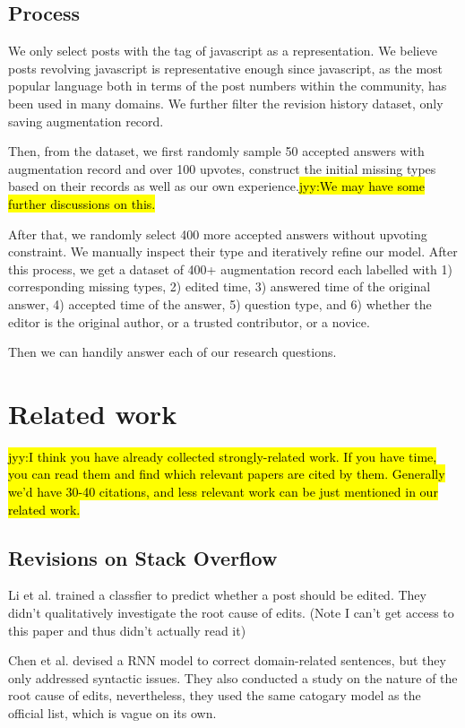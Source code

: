\documentclass[10pt,conference]{IEEEtran}
\newcommand{\jyy}[1]{\sethlcolor{yellow}\hl{jyy:#1}\xspace}
\begin{document}
\subsection {Process}
We only select posts with the tag of javascript as a representation. We believe posts revolving javascript is representative enough since javascript, as the most popular language both in terms of the post numbers within the community, has been used in many domains. We further filter the revision history dataset, only saving augmentation record.

Then, from the dataset, we first randomly sample 50 accepted answers with augmentation record and over 100 upvotes, construct the initial missing types based on their records as well as our own experience.\jyy{We may have some further discussions on this.}

After that, we randomly select 400 more accepted answers without upvoting constraint. We manually inspect their type and iteratively refine our model. After this process, we get a dataset of 400+ augmentation record each labelled with 1) corresponding missing types, 2) edited time, 3) answered time of the original answer, 4) accepted time of the answer, 5) question type, and 6) whether the editor is the original author, or a trusted contributor, or a novice.

Then we can handily answer each of our research questions.

\section {Related work}

\jyy{I think you have already collected strongly-related work. If you have time, you can read them and find which relevant papers are cited by them. Generally we'd have 30-40 citations, and less relevant work can be just mentioned in our related work.}

\subsection {Revisions on Stack Overflow}

Li et al. \cite{JIT1397} trained a classfier to predict whether a post should be edited. They didn't qualitatively investigate the root cause of edits. (Note I can't get access to this paper and thus didn't actually read it)

Chen et al. \cite{Chen:2017:CCD:3171581.3134667} devised a RNN model to correct domain-related sentences, but they only addressed syntactic issues. They also conducted a study on the nature of the root cause of edits, nevertheless, they used the same catogary model as the official list, which is vague on its own.
\end{document}
